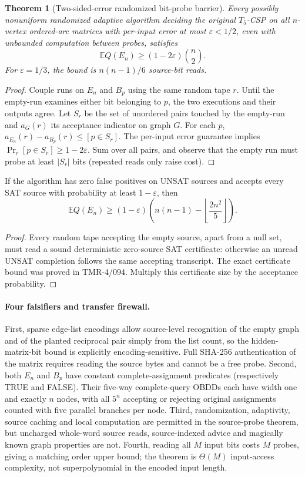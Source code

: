 \documentclass[11pt]{article}
\newtheorem{theorem}{Theorem}
\begin{document}
\begin{theorem}[Two-sided-error randomized bit-probe barrier]
Every possibly nonuniform randomized adaptive algorithm deciding
the original $T_5$-CSP on all $n$-vertex ordered-arc matrices with
per-input error at most $\varepsilon<1/2$, even with unbounded
computation between probes, satisfies
\[
 \mathbb E Q(E_n)\ge(1-2\varepsilon)\binom n2.
\]
For $\varepsilon=1/3$, the bound is $n(n-1)/6$ source-bit reads.
\end{theorem}
\begin{proof}
Couple runs on $E_n$ and $B_p$ using the same random tape $r$.
Until the empty-run examines either bit belonging to $p$, the
two executions and their outputs agree. Let $S_r$ be the set of
unordered pairs touched by the empty-run and $a_G(r)$ its
acceptance indicator on graph $G$. For each $p$,
$a_{E_n}(r)-a_{B_p}(r)\le[p\in S_r]$.
The per-input error guarantee implies
$\Pr_r[p\in S_r]\ge1-2\varepsilon$.
Sum over all pairs, and observe that the empty run must probe
at least $|S_r|$ bits (repeated reads only raise cost).
\end{proof}
\begin{corollary}
If the algorithm has zero false positives on UNSAT sources and
accepts every SAT source with probability at least $1-\varepsilon$,
then
\[
\mathbb E Q(E_n)\ge(1-\varepsilon)
\left(n(n-1)-\left\lfloor\frac{2n^2}{5}\right\rfloor\right).
\]
\end{corollary}
\begin{proof}
Every random tape accepting the empty source, apart from a null
set, must read a sound deterministic zero-source SAT certificate:
otherwise an unread UNSAT completion follows the same accepting
transcript. The exact certificate bound was proved in TMR-4/094.
Multiply this certificate size by the acceptance probability.
\end{proof}

\paragraph{Four falsifiers and transfer firewall.}
First, sparse edge-list encodings allow source-level recognition
of the empty graph and of the planted reciprocal pair simply
from the list count, so the hidden-matrix-bit bound is explicitly
encoding-sensitive. Full SHA-256 authentication of the matrix
requires reading the source bytes and cannot be a free probe.
Second, both $E_n$ and $B_p$ have constant complete-assignment
predicates (respectively TRUE and FALSE). Their five-way
complete-query OBDDs each have width one and exactly $n$ nodes,
with all $5^n$ accepting or rejecting original assignments counted
with five parallel branches per node. Third, randomization,
adaptivity, source caching and local computation are permitted in
the source-probe theorem, but uncharged whole-word source reads,
source-indexed advice and magically known graph properties are not.
Fourth, reading all $M$ input bits costs $M$ probes, giving a
matching order upper bound; the theorem is $\Theta(M)$ input-access
complexity, not superpolynomial in the encoded input length.
\end{document}
